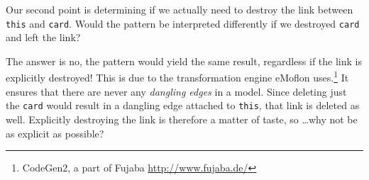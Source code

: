 Our second point is determining if we actually need to destroy the link between \texttt{this} and \texttt{card}. Would the pattern be interpreted differently if we
destroyed \texttt{card} and left the link?

The answer is no, the pattern would yield the same result, regardless if the link is explicitly destroyed!  This is due to the
transformation engine eMoflon uses.\footnote{CodeGen2, a part of Fujaba \url{http://www.fujaba.de/}} It ensures that there are never any \emph{dangling edges}
in a model. Since deleting just the \texttt{card} would result in a dangling edge attached to \texttt{this}, that link is deleted as well. Explicitly
destroying the link is therefore a matter of taste, so \ldots why not be as explicit as possible?





